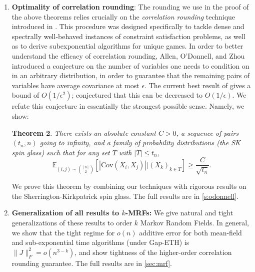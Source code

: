 \documentclass[11pt, oneside, english]{article}
\newcommand{\bE}{\mathbb{E}}
\newcommand{\F}{\mathcal{F}}
\newcommand{\Cov}{\mathrm{Cov}}
\newcommand{\E}{\bE}      %
\newtheorem{theorem}{Theorem}[section]
\theoremstyle{definition}
\theoremstyle{plain}
\begin{document}
\begin{enumerate}
More precisely: 
\begin{theorem} We can approximate $\F$ up to an additive factor of $o(n)$ in time $2^{o(n)}$ if $\|J\|^2_F = o(n)$. Moreover, we can also output a product distribution achieving this approximation. On the other hand, for $\|J\|^2_F = \Theta(n)$, it is Gap-ETH-hard to approximate $\F$ up to an additive factor of $o(n)$ in subexponential time. 
\label{thm:algorithm-imprecise}
\end{theorem}
We also describe how to accelerate the algorithm on dense graphs using random subsampling.
The full results are in \cref{s:algorithmic}.
\item {\bf Optimality of correlation rounding}: The rounding we use in the proof of the above theorems relies crucially on the \emph{correlation rounding} technique introduced in \cite{barak2011rounding}. This procedure was designed specifically to tackle dense and spectrally well-behaved instances of constraint satisfaction problems, as well as to derive subexponential algorithms for unique games. In order to better understand the efficacy of correlation rounding, Allen, O'Donnell, and Zhou \cite{allen2015conditioning} introduced a conjecture on the number of variables one needs to condition on in an arbitrary distribution, in order to guarantee that the remaining pairs of variables have average covariance at most $\epsilon$. The current best result of \cite{raghavendra-tan} gives a bound of $O(1/\epsilon^2)$; \cite{allen2015conditioning} conjectured that this can be decreased to $O(1/\epsilon)$. We refute this conjecture in essentially the strongest possible sense. Namely, we show:  
\begin{theorem}
\label{thm:refutation-AOZ}
There exists an absolute constant $C > 0$, a sequence of pairs $(t_n,n)$ going to infinity, and a family of probability distributions (the SK spin glass) such that for \emph{any set} $T$ with $|T| \le t_n$,
$$\E_{(i,j) \sim {[n] \choose 2}} \left[\left|\Cov(X_i,X_j) \right| | (X_k)_{k\in T}\right] \ge \frac{C}{\sqrt{t_n}}. $$
\end{theorem}

We prove this theorem by combining our techniques with rigorous results on the Sherrington-Kirkpatrick spin glass.
The full results are in \cref{s:odonnell}. 
\item \textbf{Generalization of all results to $k$-MRFs: } We give  natural and tight generalizations of these results to order $k$ Markov Random Fields. In general, we show that the tight regime for $o(n)$ additive error for both mean-field and sub-exponential time algorithms (under Gap-ETH) is $\|J\|_F^2 = o(n^{3 - k})$, and show tightness of the higher-order correlation rounding guarantee. The full results are in \cref{sec:mrf}.
\end{enumerate}
\end{document}
